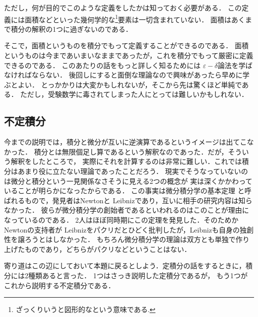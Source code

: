 ただし，何が目的でこのような定義をしたかは知っておく必要がある．
この定義には面積などといった幾何学的な\footnote{ざっくりいうと図形的なという意味である.}要素は一切含まれていない．
面積はあくまで積分の解釈の1つに過ぎないのである．

そこで，面積というものを積分でもって定義することができるのである．
面積というものは今まであいまいなままであったが，これを積分でもって厳密に定義できるのである．
このあたりの話をもっと詳しく知るためには
$\varepsilon-\delta$論法を学ばなければならない．
後回しにすると面倒な理論なので興味があったら早めに学ぶとよい．
とっかかりは大変かもしれないが，そこから先は驚くほど単純である．
ただし，受験数学に毒されてしまった人にとっては難しいかもしれない．
\subsection{不定積分}
今までの説明では，積分と微分が互いに逆演算であるというイメージは出てこなかった．
積分とは無限個足し算であるという解釈なのであった．だが，そういう解釈をしたところで，
実際にそれを計算するのは非常に難しい．これでは積分はあまり役に立たない理論であったことだろう．
現実でそうなっていないのは微分と積分という一見関係なさそうに見える2つの概念が
実は深くかかわっていることが明らかになったからである．
この事実は微分積分学の基本定理
と呼ばれるもので，発見者はNewtonと
Leibnizであり，互いに相手の研究内容は知らなかった． 
彼らが微分積分学の創始者であるといわれるのはこのことが理由になっているのである．
2人はほぼ同時期にこの定理を発見した．そのためかNewtonの支持者が
Leibnizをパクリだとひどく批判したが，Leibnizも自身の独創性を譲ろうとはしなかった．
もちろん微分積分学の理論は双方とも単独で作り上げたものであり，どちらがパクリなどということはない．

寄り道はこの辺にしておいて本題に戻るとしよう．定積分の話をするときに，積分には2種類あると言った．
1つはさっき説明した定積分であるが，
もう1つがこれから説明する不定積分である．

